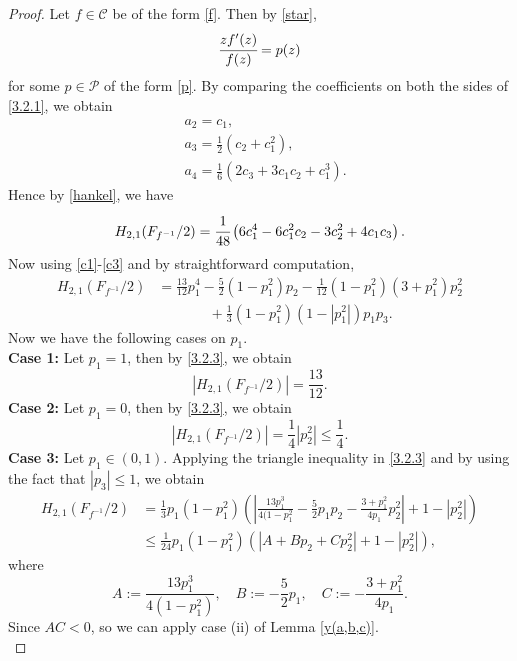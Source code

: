 \documentclass[a4paper,12pt]{amsart}
\theoremstyle{definition}
\numberwithin{equation}{section}
\begin{document}
\begin{proof}
Let $f\in \mathcal{C}$ be of the form \eqref{f}. Then by \eqref{star},
\begin{equation}\label{3.2.1}
\cfrac{zf'(z)}{f(z)}=p(z)
\end{equation}
for some $p \in \mathcal{P}$ of the form \eqref{p}. By comparing the coefficients on both the sides of \eqref{3.2.1}, we obtain
	\begin{equation}\label{3.2.2}
		\begin{aligned}
			& a_2=c_1, \\[2mm]
			& a_3=\frac{1}{2}(c_2+c_1^2), \\[2mm]
			& a_4=\frac{1}{6}\left(2c_3+3c_1c_2+c_1^3 \right).
		\end{aligned}
	\end{equation}
Hence by \eqref{hankel}, we have
$$
H_{2,1}(F_{f^{-1}}/2)=\cfrac{1}{48}\left(6c_1^4-6c_1^2c_2-3c_2^2+4 c_1c_3\right).
$$
Now using \eqref{c1}-\eqref{c3} and by straightforward computation,
\begin{equation}\label{3.2.3}
\begin{aligned}
H_{2,1}(F_{f^{-1}}/2)
&=\frac{13}{12}p_1^4-\frac{5}{2}(1-p_1^2)p_2-\frac{1}{12}(1-p_1^2)(3+p_1^2)p_2^2\\
&\,\,\,\, \quad \quad \quad +\frac{1}{3}(1-p_1^2)(1-|p_1^2|)p_1p_3.
\end{aligned}
\end{equation}
Now we have the following cases on $p_1$.\\[1mm]
\textbf{Case 1:} Let $p_1=1$, then by \eqref{3.2.3}, we obtain
$$
|H_{2,1}(F_{f^{-1}}/2)|=\frac{13}{12}.
$$
\textbf{Case 2:} Let $p_1=0$, then by \eqref{3.2.3}, we obtain
$$
|H_{2,1}(F_{f^{-1}}/2)|=\frac{1}{4}|p_2^2|\leq\frac{1}{4}.
$$
\textbf{Case 3:} Let $p_1 \in (0,1)$. Applying the triangle inequality in \eqref{3.2.3} and by using the fact
that $|p_3| \leq 1$, we obtain
\begin{equation}\label{3.2.4}
\begin{aligned}
H_{2,1}(F_{f^{-1}}/2)
&=\frac{1}{3}p_1(1-p_1^2)\left(\left| \frac{13p_1^3}{4(1-p_1^2}-\frac{5}{2}p_1 p_2-\frac{3+p_1^2}{4p_1}p_2^2 \right|+1-|p_2^2|\right)\\
&\leq \frac{1}{24}p_1(1-p_1^2)\left(\left| A+B p_2+C p_2^2 \right|+1-|p_2^2|\right),
\end{aligned}
\end{equation}
where 
$$
A:=\frac{13p_1^3}{4(1-p_1^2)}, \quad B:=-\frac{5}{2}p_1,\quad C:=-\frac{3+p_1^2}{4p_1}.
$$
Since $AC < 0$, so we can apply case (ii) of Lemma \ref{y(a,b,c)}.\\

\end{proof}
\end{document}
